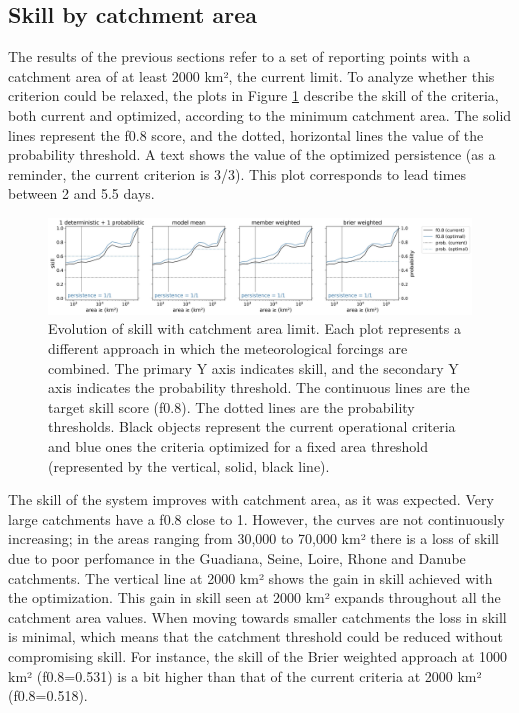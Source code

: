 \documentclass[preprint,12pt]{elsarticle}
\begin{document}
\subsection{Skill by catchment area}

The results of the previous sections refer to a set of reporting points with a catchment area of at least 2000 km², the current limit. To analyze whether this criterion could be relaxed, the plots in Figure \ref{fig:skill_area} describe the skill of the criteria, both current and optimized, according to the minimum catchment area. The solid lines represent the f0.8 score, and the dotted, horizontal lines the value of the probability threshold. A text shows the value of the optimized persistence (as a reminder, the current criterion is 3/3). This plot corresponds to lead times between 2 and 5.5 days.

\begin{figure}
    \centering
    \includegraphics[width=1\textwidth]{figures/skill_vs_area_2000km2_1239points_060h.jpg}
    \caption{Evolution of skill with catchment area limit. Each plot represents a different approach in which the meteorological forcings are combined. The primary Y axis indicates skill, and the secondary Y axis indicates the probability threshold. The continuous lines are the target skill score (f0.8). The dotted lines are the probability thresholds. Black objects represent the current operational criteria and blue ones the criteria optimized for a fixed area threshold (represented by the vertical, solid, black line).}
    \label{fig:skill_area}
\end{figure}

The skill of the system improves with catchment area, as it was expected. Very large catchments have a f0.8 close to 1. However, the curves are not continuously increasing; in the areas ranging from 30,000 to 70,000 km² there is a loss of skill due to poor perfomance in the Guadiana, Seine, Loire, Rhone and Danube catchments. The vertical line at 2000 km² shows the gain in skill achieved with the optimization. This gain in skill seen at 2000 km² expands throughout all the catchment area values. When moving towards smaller catchments the loss in skill is minimal, which means that the catchment threshold could be reduced without compromising skill. For instance, the skill of the Brier weighted approach at 1000 km² (f0.8=0.531) is a bit higher than that of the current criteria at 2000 km² (f0.8=0.518).
\end{document}
